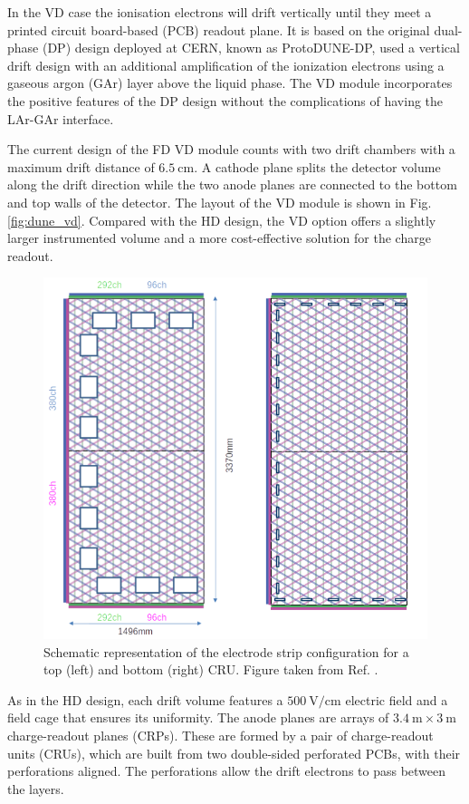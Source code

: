 In the VD case the ionisation electrons will drift vertically until they meet a printed circuit board-based (PCB) readout plane. It is based on the original dual-phase (DP) design deployed at CERN, known as ProtoDUNE-DP, used a vertical drift design with an additional amplification of the ionization electrons using a gaseous argon (GAr) layer above the liquid phase. The VD module incorporates the positive features of the DP design without the complications of having the LAr-GAr interface.

The current design of the FD VD module counts with two drift chambers with a maximum drift distance of $6.5~\mathrm{cm}$. A cathode plane splits the detector volume along the drift direction while the two anode planes are connected to the bottom and top walls of the detector. The layout of the VD module is shown in Fig. \ref{fig:dune_vd}. Compared with the HD design, the VD option offers a slightly larger instrumented volume and a more cost-effective solution for the charge readout.

\begin{figure}[t]
	\centering
	\includegraphics[width=0.70\linewidth]{Images/DUNE/FD/3V_anode_layout}
	\caption[Schematic representation of the electrode strip configuration for a top and bottom CRU.]{Schematic representation of the electrode strip configuration for a top (left) and bottom (right) CRU. Figure taken from Ref. \cite{DUNEVDTDR}.}
	\label{fig:dune_cru}
\end{figure}

As in the HD design, each drift volume features a $500~\mathrm{V/cm}$ electric field and a field cage that ensures its uniformity. The anode planes are arrays of $3.4~\mathrm{m}\times3~\mathrm{m}$ charge-readout planes (CRPs). These are formed by a pair of charge-readout units (CRUs), which are built from two double-sided perforated PCBs, with their perforations aligned. The perforations allow the drift electrons to pass between the layers.

